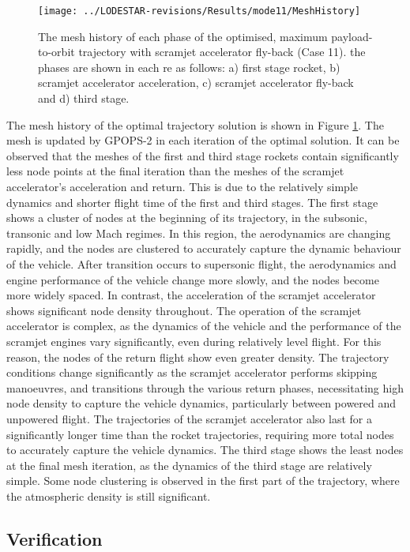 \begin{figure}[ht]
	\centering
	\texttt{[image: ../LODESTAR-revisions/Results/mode11/MeshHistory]}
	\caption{The mesh history of each phase of the optimised, maximum payload-to-orbit trajectory with scramjet accelerator fly-back (Case 11). the phases are shown in each re as follows: a) first stage rocket, b) scramjet accelerator acceleration, c) scramjet accelerator fly-back and d) third stage.}
	\label{fig:MeshHistory}
\end{figure}
The mesh history of the optimal trajectory solution is shown in Figure \ref{fig:MeshHistory}. The mesh is updated by GPOPS-2 in each iteration of the optimal solution. It can be observed that the meshes of the first and third stage rockets contain significantly less node points at the final iteration than the meshes of the scramjet accelerator's acceleration and return. This is due to the relatively simple dynamics and shorter flight time of the first and third stages. The first stage shows a cluster of nodes at the beginning of its trajectory, in the subsonic, transonic and low Mach regimes. In this region, the aerodynamics are changing rapidly, and the nodes are clustered to accurately capture the dynamic behaviour of the vehicle. After transition occurs to supersonic flight, the aerodynamics and engine performance of the vehicle change more slowly, and the nodes become more widely spaced. In contrast, the acceleration of the scramjet accelerator shows significant node density throughout. The operation of the scramjet accelerator is complex, as the dynamics of the vehicle and the performance of the scramjet engines vary significantly, even during relatively level flight. For this reason, the nodes of the return flight show even greater density. The trajectory conditions change significantly as the scramjet accelerator performs skipping manoeuvres, and transitions through the various return phases, necessitating high node density to capture the vehicle dynamics, particularly between powered and unpowered flight. The trajectories of the scramjet accelerator also last for a significantly longer time than the rocket trajectories, requiring more total nodes to accurately capture the vehicle dynamics. The third stage shows the least nodes at the final mesh iteration, as the dynamics of the third stage are relatively simple. Some node  clustering is observed in the first part of the trajectory, where the atmospheric density is still significant. 



\subsection{Verification}

